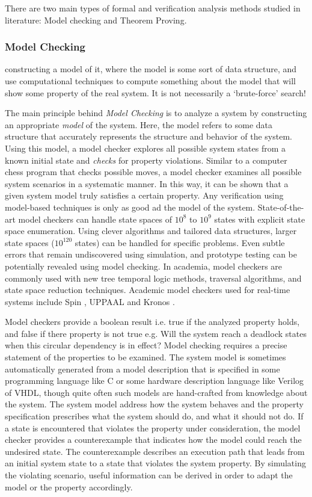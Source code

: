There are two main types of formal and verification analysis methods studied in
literature: Model checking and Theorem Proving.

\subsubsection{Model Checking}

constructing a model of it, where the model is some sort of data structure, and
use computational techniques to compute something about the model that will show
some property of the real system. It is not necessarily a ‘brute-force’ search!

The main principle behind \emph{Model Checking} is to analyze a system by
constructing an appropriate \emph{model} of the system. Here, the model refers
to some data structure that accurately represents the structure and behavior of
the system. Using this model, a model checker explores all possible system
states from a known initial state and \emph{checks} for property violations.
Similar to a computer chess program that checks possible moves, a model checker
examines all possible system scenarios in a systematic manner. In this way, it
can be shown that a given system model truly satisfies a certain property. Any
verification using model-based techniques is only as good ad the model of the
system. State-of-the-art model checkers can handle state spaces of $10^8$ to
$10^9$ states with explicit state space enumeration. Using clever algorithms and
tailored data structures, larger state spaces ($10^{120}$ states) can be handled
for specific problems. Even subtle errors that remain undiscovered using
simulation, and prototype testing can be potentially revealed using model
checking. In academia, model checkers are commonly used with new tree temporal
logic methods, traversal algorithms, and state space reduction techniques.
Academic model checkers used for real-time systems include Spin
\cite{holzmann2004spin}, UPPAAL \cite{larsen1997uppaal} and Kronos
\cite{yovine1997kronos}.

Model checkers provide a boolean result i.e. true if the analyzed property
holds, and false if there property is not true e.g. Will the system reach a
deadlock states when this circular dependency is in effect? Model checking
requires a precise statement of the properties to be examined. The system model
is sometimes automatically generated from a model description that is specified
in some programming language like C or some hardware description language like
Verilog of VHDL, though quite often such models are hand-crafted from knowledge
about the system. The system model address how the system behaves and the
property specification prescribes what the system should do, and what it should
not do. If a state is encountered that violates the property under
consideration, the model checker provides a counterexample that indicates how
the model could reach the undesired state. The counterexample describes an
execution path that leads from an initial system state to a state that violates
the system property. By simulating the violating scenario, useful information
can be derived in order to adapt the model or the property accordingly.

